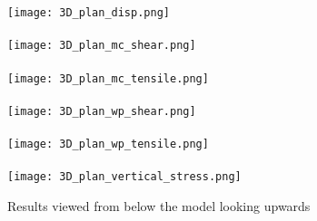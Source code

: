 \documentclass[]{scrreprt}
\begin{document}
\begin{figure}[p]
\centering
\texttt{[image: 3D\_plan\_disp.png]} \\~\\
\texttt{[image: 3D\_plan\_mc\_shear.png]} \\~\\
\texttt{[image: 3D\_plan\_mc\_tensile.png]} \\~\\
\texttt{[image: 3D\_plan\_wp\_shear.png]} \\~\\
\texttt{[image: 3D\_plan\_wp\_tensile.png]} \\~\\
\texttt{[image: 3D\_plan\_vertical\_stress.png]}
\caption{\label{3D_plan.fig}Results viewed from below the model
  looking upwards}
\end{figure}
\end{document}
